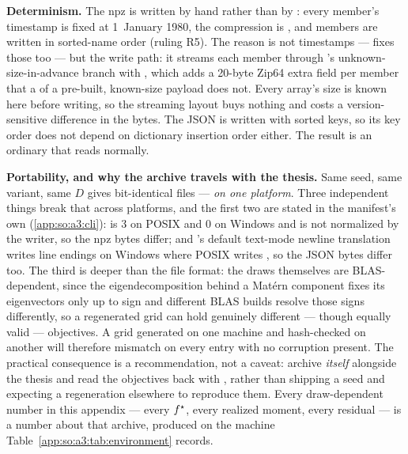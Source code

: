 \textbf{Determinism.} The npz is written by hand rather than by
: every member's timestamp is fixed at 1~January 1980, the
compression is , and members are written in sorted-name
order (ruling R5). The reason is not timestamps ---  fixes
those too --- but the write path: it streams each member through
's unknown-size-in-advance branch with ,
which adds a 20-byte Zip64 extra field per member that a  of a
pre-built, known-size payload does not. Every array's size is known here before
writing, so the streaming layout buys nothing and costs a version-sensitive
difference in the bytes. The JSON is written with sorted keys, so its key order
does not depend on dictionary insertion order either. The result is an ordinary
 that  reads normally.

\textbf{Portability, and why the archive travels with the thesis.} Same seed,
same variant, same $D$ gives bit-identical files --- \emph{on one platform}.
Three independent things break that across platforms, and the first two are
stated in the manifest's own 
(\ref{app:so:a3:cli}):  is $3$ on POSIX
and $0$ on Windows and is not normalized by the writer, so the npz bytes differ;
and 's default text-mode newline translation writes
 line endings on Windows where POSIX
writes , so the JSON bytes differ too. The third is deeper than the file format: the draws themselves are
BLAS-dependent, since the eigendecomposition behind a Mat\'ern component fixes
its eigenvectors only up to sign and different BLAS builds resolve those signs
differently, so a regenerated grid can hold genuinely different --- though
equally valid --- objectives. A grid generated on one machine and hash-checked
on another will therefore mismatch on every entry with no corruption present.
The practical consequence is a recommendation, not a caveat: archive
 \emph{itself} alongside the thesis and read the
objectives back with , rather than shipping a seed and expecting a
regeneration elsewhere to reproduce them. Every draw-dependent number in this
appendix --- every $f^\star$, every realized moment, every residual --- is a
number about that archive, produced on the machine
Table~\ref{app:so:a3:tab:environment} records.

